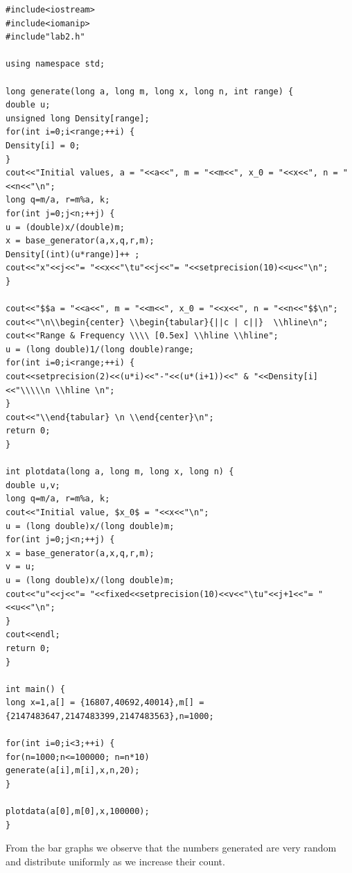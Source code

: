 \documentclass{article}
\begin{document}
\begin{lstlisting}
#include<iostream>
#include<iomanip>
#include"lab2.h"

using namespace std;

long generate(long a, long m, long x, long n, int range) {
double u;
unsigned long Density[range];
for(int i=0;i<range;++i) {
Density[i] = 0;
}
cout<<"Initial values, a = "<<a<<", m = "<<m<<", x_0 = "<<x<<", n = "<<n<<"\n";
long q=m/a, r=m%a, k;
for(int j=0;j<n;++j) {
u = (double)x/(double)m;
x = base_generator(a,x,q,r,m);
Density[(int)(u*range)]++ ;
cout<<"x"<<j<<"= "<<x<<"\tu"<<j<<"= "<<setprecision(10)<<u<<"\n";
}

cout<<"$$a = "<<a<<", m = "<<m<<", x_0 = "<<x<<", n = "<<n<<"$$\n";
cout<<"\n\\begin{center} \\begin{tabular}{||c | c||}  \\hline\n";
cout<<"Range & Frequency \\\\ [0.5ex] \\hline \\hline";
u = (long double)1/(long double)range;
for(int i=0;i<range;++i) {
cout<<setprecision(2)<<(u*i)<<"-"<<(u*(i+1))<<" & "<<Density[i]<<"\\\\\n \\hline \n";
}
cout<<"\\end{tabular} \n \\end{center}\n";
return 0;
}

int plotdata(long a, long m, long x, long n) {
double u,v;
long q=m/a, r=m%a, k;
cout<<"Initial value, $x_0$ = "<<x<<"\n";
u = (long double)x/(long double)m;
for(int j=0;j<n;++j) {
x = base_generator(a,x,q,r,m);
v = u;
u = (long double)x/(long double)m;
cout<<"u"<<j<<"= "<<fixed<<setprecision(10)<<v<<"\tu"<<j+1<<"= "<<u<<"\n";
}
cout<<endl;
return 0;
}

int main() {
long x=1,a[] = {16807,40692,40014},m[] = {2147483647,2147483399,2147483563},n=1000;

for(int i=0;i<3;++i) {
for(n=1000;n<=100000; n=n*10)
generate(a[i],m[i],x,n,20);
}

plotdata(a[0],m[0],x,100000);
}

\end{lstlisting}

From the bar graphs we observe that the numbers generated are very random 
and distribute uniformly as we increase their count.
\end{document}
